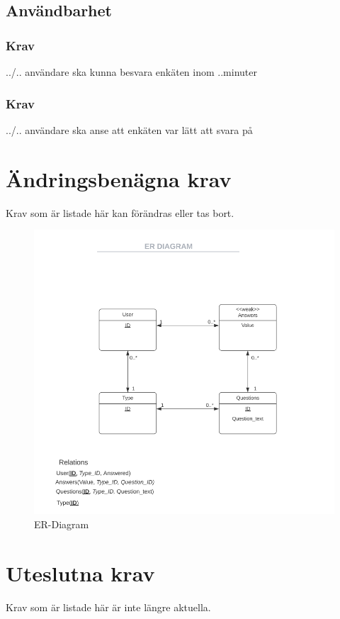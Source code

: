 \documentclass{article}
\begin{document}
    \subsection{Användbarhet}
    \subsubsection{Krav}
    ../.. användare ska kunna besvara enkäten inom ..minuter
    \subsubsection{Krav}
    ../.. användare ska anse att enkäten var lätt att svara på
    
    \section{Ändringsbenägna krav}
    Krav som är listade här kan förändras eller tas bort.
    
    \begin{figure}[h!]
    
    \includegraphics[width=150mm]{ERDIAGRAM.png}
    \caption{ER-Diagram}
    \end{figure}
    
    \section{Uteslutna krav}
    Krav som är listade här är inte längre aktuella.
    
    

    
        





\end{document}
